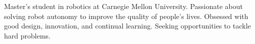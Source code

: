 

\begin{cvparagraph}

Master's student in robotics at Carnegie Mellon University.
Passionate about solving robot autonomy to improve the quality of people's lives. 
Obsessed with good design, innovation, and continual learning. %
Seeking opportunities to tackle hard problems.
\end{cvparagraph}
